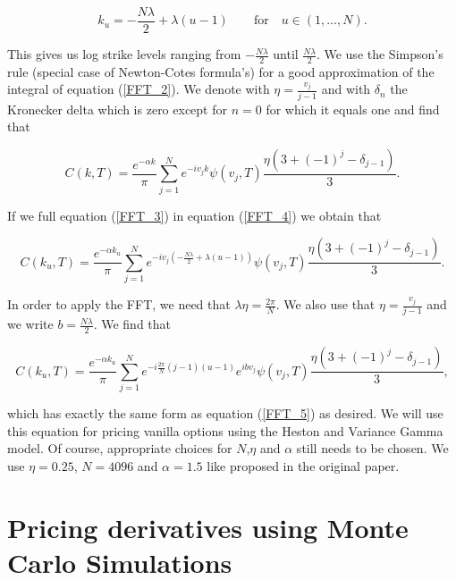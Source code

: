 \documentclass[12pt,a4paper,oneside]{book}
\begin{document}
\begin{equation}\label{FFT_3}
k_u = -\dfrac{N \lambda}{2}  + \lambda(u-1)   \qquad \text{for} \quad u \in (1,\ldots,N).
\end{equation}

This gives us log strike levels ranging from $-\frac{N \lambda}{2}$ until $\frac{N \lambda}{2}$. We use the Simpson's rule (special case of Newton-Cotes formula's) for a good approximation of the integral of equation (\ref{FFT_2}). We denote with $\eta = \frac{v_j}{j-1}$ and with $\delta_{n}$ the Kronecker delta which is zero except for $n =0$ for which it equals one and find that

\begin{equation}\label{FFT_4}
C(k,T) = \dfrac{e^{-\alpha k}}{\pi} \sum\limits^{N}_{j=1} e^{-iv_jk} \psi(v_j,T) \dfrac{\eta(3+(-1)^j-\delta_{j-1})}{3}.
\end{equation}

If we full equation (\ref{FFT_3}) in equation (\ref{FFT_4}) we obtain that 

\begin{equation}\label{FFT_6}
C(k_u,T) = \dfrac{e^{-\alpha k_u}}{\pi} \sum\limits^{N}_{j=1} e^{-iv_j \left( -\frac{N \lambda}{2}  + \lambda(u-1)\right)} \psi(v_j,T) \dfrac{\eta(3+(-1)^j-\delta_{j-1})}{3}.
\end{equation}

In order to apply the FFT, we need that $\lambda \eta = \frac{2\pi}{N}$. We also use that $\eta = \frac{v_j}{j-1}$  and we write $b =\frac{N \lambda}{2} $. We find that 

\begin{equation}
C(k_u,T) = \dfrac{e^{-\alpha k_u}}{\pi} \sum\limits^{N}_{j=1} e^{-i\frac{2\pi}{N}(j-1)(u-1)}e^{ibv_j} \psi(v_j,T) \dfrac{\eta(3+(-1)^j-\delta_{j-1})}{3},
\end{equation}

which has exactly the same form as equation (\ref{FFT_5}) as desired. We will use this equation for pricing vanilla options using the Heston and Variance Gamma model. Of course, appropriate choices for $N$,$\eta$ and $\alpha$ still needs to be chosen. We use $\eta = 0.25$, $N =4096$ and $\alpha = 1.5$ like proposed in the original paper.

\section{Pricing derivatives using Monte Carlo Simulations}\label{derivativesMCS}
\end{document}
